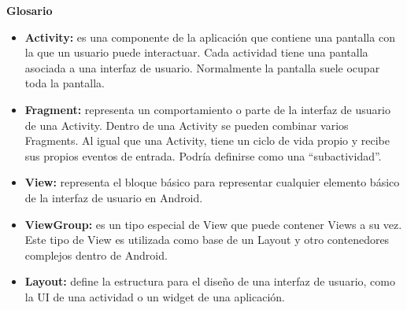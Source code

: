 \huge \textbf{Glosario}
\normalsize
\begin{itemize}
	\item \textbf{Activity:} es una componente de la aplicación que contiene una pantalla con la que un usuario puede interactuar. Cada actividad tiene una pantalla asociada a una interfaz de usuario. Normalmente la pantalla suele ocupar toda la pantalla.
	\item \textbf{Fragment:} representa un comportamiento o parte de la interfaz de usuario de una Activity. Dentro de una Activity se pueden combinar varios Fragments. Al igual que una Activity, tiene un ciclo de vida propio y recibe sus propios eventos de entrada. Podría definirse como una \enquote{subactividad}.
	\item \textbf{View:} representa el bloque básico para representar cualquier elemento básico de la interfaz de usuario en Android.
	\item \textbf{ViewGroup:} es un tipo especial de View que puede contener Views a su vez. Este tipo de View es utilizada como base de un Layout y otro contenedores complejos dentro de Android.
	\item \textbf{Layout:} define la estructura para el diseño de una interfaz de usuario, como la UI de una actividad o un widget de una aplicación.
\end{itemize}
